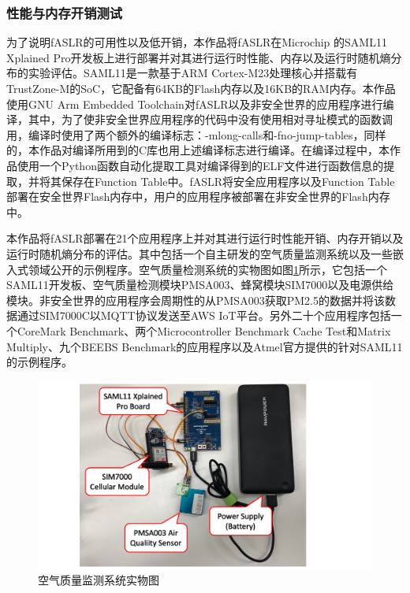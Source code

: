 \documentclass[12pt,a4paper]{ctexart}
\numberwithin{figure}{section}
\begin{document}
\subsubsection{性能与内存开销测试}
\par 为了说明fASLR的可用性以及低开销，本作品将fASLR在Microchip 的SAML11 Xplained Pro开发板上进行部署并对其进行运行时性能、内存以及运行时随机熵分布的实验评估。SAML11是一款基于ARM Cortex-M23处理核心并搭载有TrustZone-M的SoC，它配备有64KB的Flash内存以及16KB的RAM内存。本作品使用GNU Arm Embedded Toolchain对fASLR以及非安全世界的应用程序进行编译，其中，为了使非安全世界应用程序的代码中没有使用相对寻址模式的函数调用，编译时使用了两个额外的编译标志：-mlong-calls和-fno-jump-tables，同样的，本作品对编译所用到的C库也用上述编译标志进行编译。在编译过程中，本作品使用一个Python函数自动化提取工具对编译得到的ELF文件进行函数信息的提取，并将其保存在Function Table中。fASLR将安全应用程序以及Function Table部署在安全世界Flash内存中，用户的应用程序被部署在非安全世界的Flash内存中。
\par 本作品将fASLR部署在21个应用程序上并对其进行运行时性能开销、内存开销以及运行时随机熵分布的评估。其中包括一个自主研发的空气质量监测系统以及一些嵌入式领域公开的示例程序。空气质量检测系统的实物图如图\ref{physicalDrawing}所示，它包括一个SAML11开发板、空气质量检测模块PMSA003、蜂窝模块SIM7000以及电源供给模块。非安全世界的应用程序会周期性的从PMSA003获取PM2.5的数据并将该数据通过SIM7000C以MQTT协议发送至AWS IoT平台。另外二十个应用程序包括一个CoreMark Benchmark\cite{CoreMarkBenchmark}、两个Microcontroller Benchmark Cache Test和Matrix Multiply、九个BEEBS Benchmark\cite{BEEBSBenchmark}的应用程序以及Atmel官方\cite{Atmel}提供的针对SAML11的示例程序。
\begin{figure}[H] %
    \label{physicalDrawing}
    \centering
    \includegraphics[scale=0.8]{graph/physicalDrawing.png}
    \caption{空气质量监测系统实物图}
\end{figure}
\end{document}
